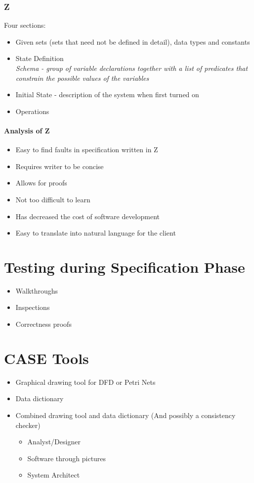 \documentclass{report}
\begin{document}
				\subsubsection{Z}
					Four sections:
					\begin{itemize}
						\item Given sets (sets that need not be defined in detail), data types and constants
						\item State Definition\\
							\textit{Schema - group of variable declarations together with a list of predicates that constrain the possible values of the variables}
						\item Initial State - description of the system when first turned on
						\item Operations
					\end{itemize}
					\paragraph{Analysis of Z}
						\begin{itemize}
							\item Easy to find faults in specification written in Z
							\item Requires writer to be concise
							\item Allows for proofs
							\item Not too difficult to learn
							\item Has decreased the cost of software development
							\item Easy to translate into natural language for the client
						\end{itemize}
		\section{Testing during Specification Phase}
			\begin{itemize}
				\item Walkthroughs
				\item Inspections
				\item Correctness proofs
			\end{itemize}
		\section{CASE Tools}
			\begin{itemize}
				\item Graphical drawing tool for DFD or Petri Nets
				\item Data dictionary
				\item Combined drawing tool and data dictionary (And possibly a consistency checker)
					\begin{itemize}
						\item Analyst/Designer
						\item Software through pictures
						\item System Architect
					\end{itemize}
			\end{itemize}
\end{document}

